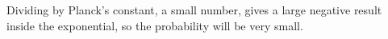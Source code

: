 Dividing by Planck's constant, a small number, gives a large negative
result inside the exponential, so the probability will be very small.



